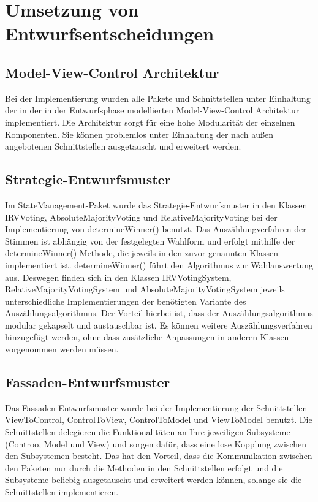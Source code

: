 \documentclass[parskip=full]{scrartcl}
\begin{document}
		
\section{Umsetzung von Entwurfsentscheidungen}
\subsection{Model-View-Control Architektur}
Bei der Implementierung wurden alle Pakete und Schnittstellen unter Einhaltung der in der in der Entwurfsphase modellierten Model-View-Control Architektur implementiert. Die Architektur sorgt für eine hohe Modularität der einzelnen Komponenten. Sie können problemlos unter Einhaltung der nach außen angebotenen Schnittstellen ausgetauscht und erweitert werden. 

\subsection{Strategie-Entwurfsmuster}
Im StateManagement-Paket wurde das Strategie-Entwurfsmuster in den Klassen IRVVoting, AbsoluteMajorityVoting und RelativeMajorityVoting bei der Implementierung von determineWinner() benutzt.
Das Auszählungverfahren der Stimmen ist abhängig von der festgelegten Wahlform und erfolgt mithilfe der determineWinner()-Methode, die jeweils in den zuvor genannten Klassen implementiert ist.
determineWinner() führt den Algorithmus zur Wahlauswertung aus. Deswegen finden sich in den Klassen IRVVotingSystem, RelativeMajorityVotingSystem und AbsoluteMajorityVotingSystem jeweils unterschiedliche Implementierungen der benötigten Variante des Auszählungsalgorithmus.
Der Vorteil hierbei ist, dass der Auszählungsalgorithmus modular gekapselt und austauschbar ist. Es können weitere Auszählungsverfahren hinzugefügt werden, ohne dass zusätzliche Anpassungen in anderen Klassen vorgenommen werden müssen.

\subsection{Fassaden-Entwurfsmuster}
Das Fassaden-Entwurfsmuster wurde bei der Implementierung der Schnittstellen ViewToControl, ControlToView, ControlToModel und ViewToModel benutzt. Die Schnittstellen delegieren die Funktionalitäten an Ihre jeweiligen Subsysteme (Controo, Model und View) und sorgen dafür, dass eine lose Kopplung zwischen den Subsystemen besteht.
Das hat den Vorteil, dass die Kommunikation zwischen den Paketen nur durch die Methoden in den Schnittstellen erfolgt und die Subsysteme beliebig ausgetauscht und erweitert werden können, solange sie die Schnittstellen implementieren.
\end{document}
